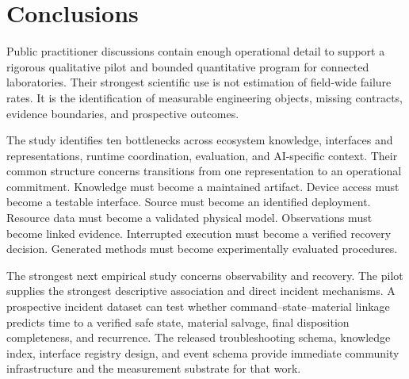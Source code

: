 \section{Conclusions}
\label{sec:conclusion}

Public practitioner discussions contain enough operational detail to support a rigorous qualitative pilot and bounded quantitative program for connected laboratories. Their strongest scientific use is not estimation of field-wide failure rates. It is the identification of measurable engineering objects, missing contracts, evidence boundaries, and prospective outcomes.

The study identifies ten bottlenecks across ecosystem knowledge, interfaces and representations, runtime coordination, evaluation, and AI-specific context. Their common structure concerns transitions from one representation to an operational commitment. Knowledge must become a maintained artifact. Device access must become a testable interface. Source must become an identified deployment. Resource data must become a validated physical model. Observations must become linked evidence. Interrupted execution must become a verified recovery decision. Generated methods must become experimentally evaluated procedures.

The strongest next empirical study concerns observability and recovery. The pilot supplies the strongest descriptive association and direct incident mechanisms. A prospective incident dataset can test whether command--state--material linkage predicts time to a verified safe state, material salvage, final disposition completeness, and recurrence. The released troubleshooting schema, knowledge index, interface registry design, and event schema provide immediate community infrastructure and the measurement substrate for that work.
